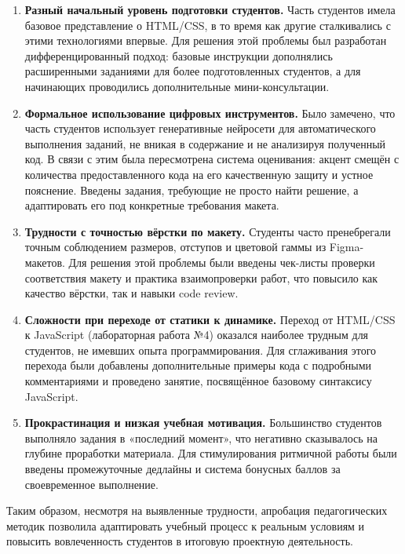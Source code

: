 \begin{enumerate}
    \item \textbf{Разный начальный уровень подготовки студентов.} Часть студентов имела базовое представление о HTML/CSS, в то время как другие сталкивались с этими технологиями впервые. Для решения этой проблемы был разработан дифференцированный подход: базовые инструкции дополнялись расширенными заданиями для более подготовленных студентов, а для начинающих проводились дополнительные мини-консультации.

    \item \textbf{Формальное использование цифровых инструментов.} Было замечено, что часть студентов использует генеративные нейросети для автоматического выполнения заданий, не вникая в содержание и не анализируя полученный код. В связи с этим была пересмотрена система оценивания: акцент смещён с количества предоставленного кода на его качественную защиту и устное пояснение. Введены задания, требующие не просто найти решение, а адаптировать его под конкретные требования макета.

    \item \textbf{Трудности с точностью вёрстки по макету.} Студенты часто пренебрегали точным соблюдением размеров, отступов и цветовой гаммы из Figma-макетов. Для решения этой проблемы были введены чек-листы проверки соответствия макету и практика взаимопроверки работ, что повысило как качество вёрстки, так и навыки code review.

    \item \textbf{Сложности при переходе от статики к динамике.} Переход от HTML/CSS к JavaScript (лабораторная работа №4) оказался наиболее трудным для студентов, не имевших опыта программирования. Для сглаживания этого перехода были добавлены дополнительные примеры кода с подробными комментариями и проведено занятие, посвящённое базовому синтаксису JavaScript.

    \item \textbf{Прокрастинация и низкая учебная мотивация.} Большинство студентов выполняло задания в «последний момент», что негативно сказывалось на глубине проработки материала. Для стимулирования ритмичной работы были введены промежуточные дедлайны и система бонусных баллов за своевременное выполнение.
\end{enumerate}

Таким образом, несмотря на выявленные трудности, апробация педагогических методик позволила адаптировать учебный процесс к реальным условиям и повысить вовлеченность студентов в итоговую проектную деятельность.

